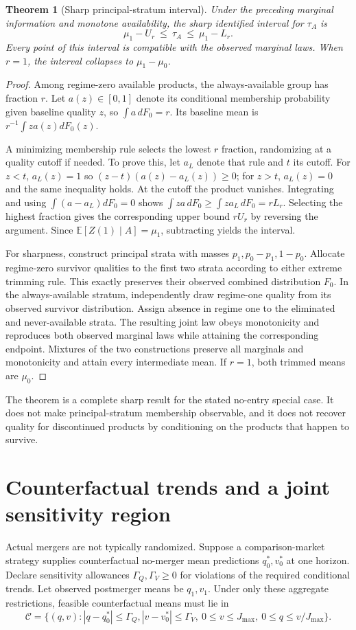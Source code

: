 \documentclass[11pt,a4paper]{article}
\newtheorem{theorem}{Theorem}[section]
\theoremstyle{definition}
\theoremstyle{remark}
\newcommand{\E}{\mathbb E}
\begin{document}
\begin{theorem}[Sharp principal-stratum interval]\label{th:trim}
Under the preceding marginal information and monotone availability, the sharp identified interval for $\tau_A$ is
\[
 \boxed{\quad \mu_1-U_r\ \leq\ \tau_A\ \leq\ \mu_1-L_r.\quad}
\]
Every point of this interval is compatible with the observed marginal laws. When $r=1$, the interval collapses to $\mu_1-\mu_0$.
\end{theorem}
\begin{proof}
Among regime-zero available products, the always-available group has fraction $r$. Let $a(z)\in[0,1]$ denote its conditional membership probability given baseline quality $z$, so $\int a\,dF_0=r$. Its baseline mean is $r^{-1}\int za(z)dF_0(z)$.

A minimizing membership rule selects the lowest $r$ fraction, randomizing at a quality cutoff if needed. To prove this, let $a_L$ denote that rule and $t$ its cutoff. For $z<t$, $a_L(z)=1$ so $(z-t)(a(z)-a_L(z))\geq0$; for $z>t$, $a_L(z)=0$ and the same inequality holds. At the cutoff the product vanishes. Integrating and using $\int(a-a_L)dF_0=0$ shows $\int za\,dF_0\geq\int za_L\,dF_0=rL_r$. Selecting the highest fraction gives the corresponding upper bound $rU_r$ by reversing the argument. Since $\E[Z(1)\mid A]=\mu_1$, subtracting yields the interval.

For sharpness, construct principal strata with masses $p_1,p_0-p_1,1-p_0$. Allocate regime-zero survivor qualities to the first two strata according to either extreme trimming rule. This exactly preserves their observed combined distribution $F_0$. In the always-available stratum, independently draw regime-one quality from its observed survivor distribution. Assign absence in regime one to the eliminated and never-available strata. The resulting joint law obeys monotonicity and reproduces both observed marginal laws while attaining the corresponding endpoint. Mixtures of the two constructions preserve all marginals and monotonicity and attain every intermediate mean. If $r=1$, both trimmed means are $\mu_0$.
\end{proof}

The theorem is a complete sharp result for the stated no-entry special case. It does not make principal-stratum membership observable, and it does not recover quality for discontinued products by conditioning on the products that happen to survive.

\section{Counterfactual trends and a joint sensitivity region}
Actual mergers are not typically randomized. Suppose a comparison-market strategy supplies counterfactual no-merger mean predictions $q_0^*,v_0^*$ at one horizon. Declare sensitivity allowances $\Gamma_Q,\Gamma_V\geq0$ for violations of the required conditional trends. Let observed postmerger means be $q_1,v_1$. Under only these aggregate restrictions, feasible counterfactual means must lie in
\[
 \mathcal C=\{(q,v):|q-q_0^*|\leq\Gamma_Q,
 |v-v_0^*|\leq\Gamma_V,\ 0\leq v\leq J_{\max},\ 0\leq q\leq v/J_{\max}\}.
\]
\end{document}
